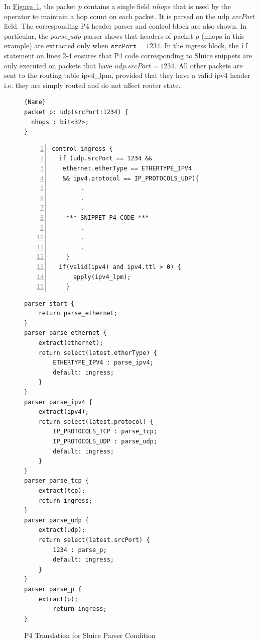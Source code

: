 \documentclass[12pt, oneside]{article}
\newcommand{\irref}[2]{\hyperref[#2]{#1~\ref{#2}}}
\begin{document}
In \irref{Figure}{pca}, the packet $p$ contains a single field $nhops$ that is used by the operator to maintain a hop count on each packet. It is parsed on the udp $srcPort$ field.  The corresponding P4 header parser and control block are also shown. In particular, the $parse\_udp$ parser shows that headers of packet $p$ (nhops in this example) are extracted only when $\texttt{srcPort}=1234$. In the ingress block, the \texttt{if} statement on lines 2-4 ensures that P4 code corresponding to Sluice snippets are only executed on packets that have $udp.srcPort = 1234$. All other packets are sent to the routing table ipv4\_lpm, provided that they have a valid ipv4 header i.e. they are simply routed and do not affect router state.

\begin{figure}
\caption{P4 Translation for Sluice Parser Condition}\label{pca}
\noindent\begin{minipage}{.45\textwidth}
\begin{lstlisting}[basicstyle=\linespread{1.3}\scriptsize, title={Sluice Parser Condition},frame=tlrb]{Name}
packet p: udp(srcPort:1234) {
  nhops : bit<32>;
}
\end{lstlisting}
\begin{lstlisting}[numbers=left, firstnumber=1, title={P4 Ingress Control Block}, basicstyle=\linespread{1.3}\scriptsize, frame=tlrb]
control ingress {
  if (udp.srcPort == 1234 && 
   ethernet.etherType == ETHERTYPE_IPV4 
   && ipv4.protocol == IP_PROTOCOLS_UDP){
		.
		.
		.
	*** SNIPPET P4 CODE ***
		.
		.
		.
	}
  if(valid(ipv4) and ipv4.ttl > 0) {
      apply(ipv4_lpm);
    }
\end{lstlisting}

\end{minipage}\hfill
\begin{minipage}{.45\textwidth}
\begin{lstlisting}[title={P4 Parser},frame=tlrb, basicstyle=\linespread{1.08}\scriptsize]
parser start {
    return parse_ethernet;
}
parser parse_ethernet {
    extract(ethernet);
    return select(latest.etherType) {
        ETHERTYPE_IPV4 : parse_ipv4;
        default: ingress;
    }
}
parser parse_ipv4 {
    extract(ipv4);
    return select(latest.protocol) {
        IP_PROTOCOLS_TCP : parse_tcp;
        IP_PROTOCOLS_UDP : parse_udp;
        default: ingress;
    }
}
parser parse_tcp {
    extract(tcp);
    return ingress;
}
parser parse_udp {
    extract(udp);
    return select(latest.srcPort) {
        1234 : parse_p;
        default: ingress;
    }
}
parser parse_p {
    extract(p);
        return ingress;
}
\end{lstlisting}
\end{minipage}
\end{figure}
\end{document}
